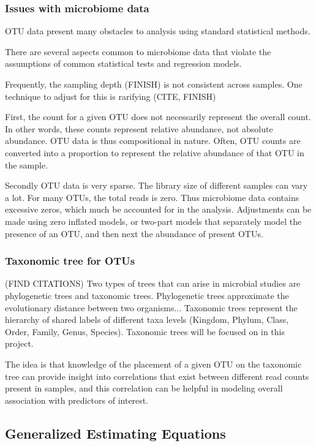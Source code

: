 \documentclass[12pt]{article}
\begin{document}
\subsubsection{Issues with microbiome data}

OTU data present many obstacles to analysis using standard statistical methods.

There are several aspects common to microbiome data that violate the assumptions of common statistical tests and regression models.

Frequently, the sampling depth (FINISH) is not consistent across samples. One technique to adjust for this is rarifying (CITE, FINISH)

First, the count for a given OTU does not necessarily represent the overall count. In other words, these counts represent relative abundance, not absolute abundance. OTU data is thus compositional in nature. Often, OTU counts are converted into a proportion to represent the relative abundance of that OTU in the sample.

Secondly OTU data is very sparse. The library size of different samples can vary a lot. For many OTUs, the total reads is zero. Thus microbiome data contains excessive zeros, which much be accounted for in the analysis.
Adjustments can be made using zero inflated models, or two-part models that separately model the presence of an OTU, and then next the abundance of present OTUs.




\subsubsection{Taxonomic tree for OTUs}

(FIND CITATIONS)
Two types of trees that can arise in microbial studies are phylogenetic trees and taxonomic trees. Phylogenetic trees approximate the evolutionary distance between two organisms... Taxonomic trees represent the hierarchy of shared labels of different taxa levels (Kingdom, Phylum, Class, Order, Family, Genus, Species). Taxonomic trees will be focused on in this project.

The idea is that knowledge of the placement of a given OTU on the taxonomic tree can provide insight into correlations that exist between different read counts present in samples, and this correlation can be helpful in modeling overall association with predictors of interest.

\subsection{Generalized Estimating Equations}
\end{document}

